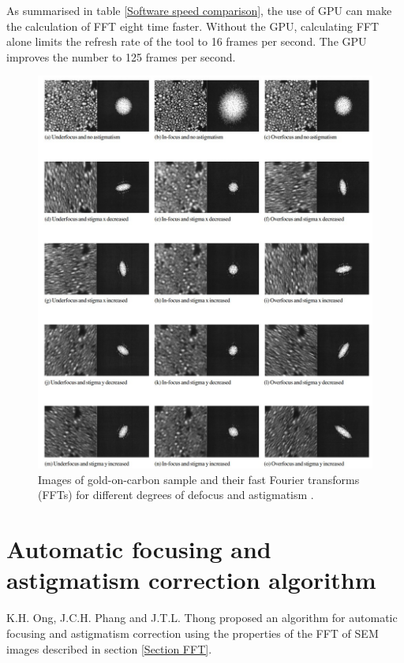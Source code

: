\documentclass[12pt, conference]{IEEEtran}
\begin{document}
As summarised in table \ref{Software speed comparison}, the use of GPU can make the calculation of FFT eight time faster. Without the GPU, calculating FFT alone limits the refresh rate of the tool to 16 frames per second. The GPU improves the number to 125 frames per second.

\begin{figure}
    \centering
    \includegraphics[width=1\textwidth]{Images/SEM astigmatism.jpg}
    \caption{Images of gold-on-carbon sample and their fast Fourier transforms (FFTs) for different degrees of defocus and astigmatism \cite{SEM correction algorithm}.}
    \label{SEM astigmatism}
\end{figure}

\section{Automatic focusing and astigmatism correction algorithm}
\label{Section correction algorithm}
K.H. Ong, J.C.H. Phang and J.T.L. Thong proposed an algorithm for automatic focusing and astigmatism correction \cite{SEM correction algorithm} using the properties of the FFT of SEM images described in section \ref{Section FFT}.
\end{document}
